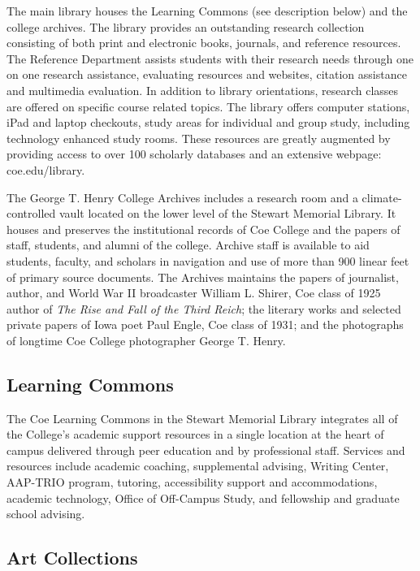 \documentclass[
  letterpaper,
]{scrbook}
\begin{document}
The main library houses the Learning Commons (see description below) and
the college archives. The library provides an outstanding research
collection consisting of both print and electronic books, journals, and
reference resources. The Reference Department assists students with
their research needs through one on one research assistance, evaluating
resources and websites, citation assistance and multimedia evaluation.
In addition to library orientations, research classes are offered on
specific course related topics. The library offers computer stations,
iPad and laptop checkouts, study areas for individual and group study,
including technology enhanced study rooms. These resources are greatly
augmented by providing access to over 100 scholarly databases and an
extensive webpage: coe.edu/library.

The George T. Henry College Archives includes a research room and a
climate-controlled vault located on the lower level of the Stewart
Memorial Library. It houses and preserves the institutional records of
Coe College and the papers of staff, students, and alumni of the
college. Archive staff is available to aid students, faculty, and
scholars in navigation and use of more than 900 linear feet of primary
source documents. The Archives maintains the papers of journalist,
author, and World War II broadcaster William L. Shirer, Coe class of
1925 author of \emph{The Rise and Fall of the Third Reich}; the literary
works and selected private papers of Iowa poet Paul Engle, Coe class of
1931; and the photographs of longtime Coe College photographer George T.
Henry.

\subsection{Learning Commons}\label{learning-commons}

The Coe Learning Commons in the Stewart Memorial Library integrates all
of the College's academic support resources in a single location at the
heart of campus delivered through peer education and by professional
staff. Services and resources include academic coaching, supplemental
advising, Writing Center, AAP-TRIO program, tutoring, accessibility
support and accommodations, academic technology, Office of Off-Campus
Study, and fellowship and graduate school advising.

\subsection{Art Collections}\label{art-collections}
\end{document}
